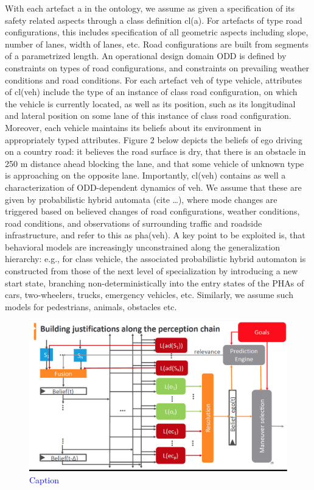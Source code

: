 With each artefact  a  in the ontology, we assume as given a specification of its safety related aspects through a class definition cl(a). For artefacts of type road configurations, this includes specification of all geometric aspects including slope, number of lanes, width of lanes, etc. Road configurations are built from segments of a parametrized length. An operational design domain ODD is defined by constraints on types of road configurations, and constraints on prevailing weather conditions and road conditions. For each artefact veh of type vehicle, attributes of cl(veh) include the type of an instance of class road configuration, on which the vehicle is currently located, as well as its position, such as its longitudinal and lateral position on some lane of this instance of class road configuration. Moreover, each vehicle maintains its beliefs about its environment in appropriately typed attributes. Figure 2 below depicts the beliefs of ego driving on a country road: it believes the road surface is dry, that there is an obstacle in 250 m distance ahead blocking the lane, and that some vehicle of unknown type is approaching on the opposite lane. Importantly, cl(veh) contains as well a characterization of ODD-dependent dynamics of veh. We assume that these are given by probabilistic hybrid automata (cite \ldots), where mode changes are triggered based on believed changes of road configurations, weather conditions, road conditions, and observations of surrounding traffic and roadside infrastructure, and refer to this as pha(veh). A key point to be exploited is, that behavioral models are increasingly unconstrained along the generalization hierarchy: e.g., for class vehicle, the associated probabilistic hybrid automaton is constructed from those of the next level of specialization by introducing a new start state, branching non-deterministically into the entry states of the PHAs of cars, two-wheelers, trucks, emergency vehicles, etc. Similarly, we assume such models for pedestrians, animals, obstacles etc.

\begin{figure}
    \centering
    \includegraphics[width=\textwidth]{fig2.eps}
    \caption{\textcolor{blue}{Caption}}
    \label{fig2}
\end{figure}

